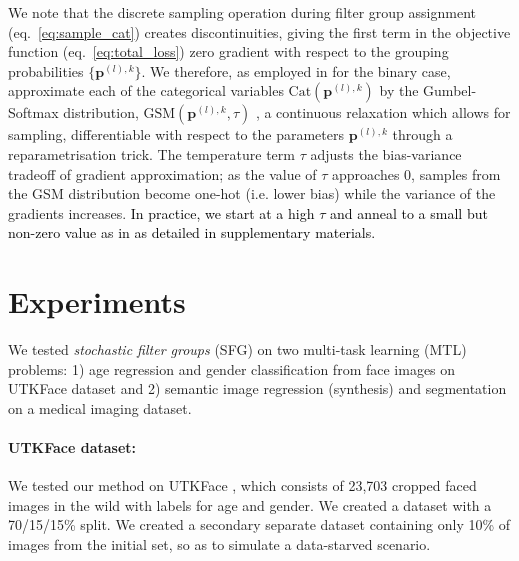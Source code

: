 We note that the discrete sampling operation during filter group assignment (eq.~\eqref{eq:sample_cat}) creates discontinuities, giving the first term in the objective function (eq.~\ref{eq:total_loss}) zero gradient with respect to the grouping probabilities $\{\mathbf{p}^{(l),k}\}$. We therefore, as employed in \cite{kendall2017multi} for the binary case, approximate each of the categorical variables $\text{Cat}(\mathbf{p}^{(l),k})$ by the Gumbel-Softmax distribution, $\text{GSM}(\mathbf{p}^{(l),k}, \tau)$ \cite{maddison2016concrete,jang2016categorical}, a continuous relaxation which allows for sampling, differentiable with respect to the parameters $\mathbf{p}^{(l),k}$ through a reparametrisation trick. The temperature term $\tau$ adjusts the bias-variance tradeoff of gradient approximation; as the value of $\tau$ approaches 0, samples from the GSM distribution become one-hot (i.e. lower bias) while the variance of the gradients increases. \textcolor{black}{In practice, we start at a high $\tau$ and anneal to a small but non-zero value as in \cite{jang2016categorical,gal2017concrete} as detailed in supplementary materials.}






\section{Experiments}\label{sec:experiments}
We tested \emph{stochastic filter groups} (SFG) on two multi-task learning (MTL) problems: 1) age regression and gender classification from face images on UTKFace dataset \cite{zhifei2017cvpr} and 2) semantic image regression (synthesis) and segmentation on a medical imaging dataset. 

    \paragraph{UTKFace dataset:} We tested our method on UTKFace \cite{zhifei2017cvpr}, which consists of 23,703 cropped faced images in the wild with labels for age and gender. We created a dataset with a 70/15/15\% split. We created a secondary separate dataset containing only 10\% of images from the initial set, so as to simulate a data-starved scenario.
